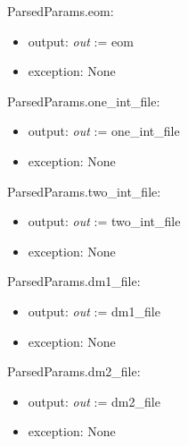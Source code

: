 \documentclass[12pt, titlepage]{article}
\begin{document}
\noindent ParsedParams.eom:
\begin{itemize}
	\item output: \textit{out} := eom 
	\item exception: None 
\end{itemize}

\noindent ParsedParams.one\_int\_file:
\begin{itemize}
	\item output: \textit{out} := one\_int\_file
	\item exception: None 
\end{itemize}

\noindent ParsedParams.two\_int\_file:
\begin{itemize}
	\item output: \textit{out} := two\_int\_file
	\item exception: None 
\end{itemize}

\noindent ParsedParams.dm1\_file:
\begin{itemize}
	\item output: \textit{out} := dm1\_file 
	\item exception: None 
\end{itemize}

\noindent ParsedParams.dm2\_file:
\begin{itemize}
	\item output: \textit{out} := dm2\_file 
	\item exception: None 
\end{itemize}

%
\end{document}
